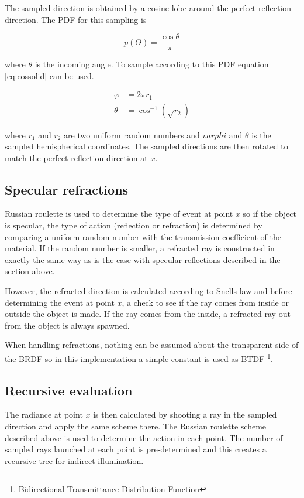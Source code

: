 \documentclass[a4paper]{report}
\begin{document}
The sampled direction is obtained by a cosine lobe around the perfect
reflection direction. The PDF for this sampling is

\begin{equation}
  p(\Theta) = \frac{\cos{\theta}}{\pi}
\end{equation}

where \(\theta\) is the incoming angle. To sample according to this
PDF equation \ref{eq:cossolid} can be used.

\begin{align}
  \varphi &= 2 \pi r_1 \nonumber \\
  \theta &= \cos^{-1}(\sqrt{r_2})
  \label{eq:cossolid}
\end{align}

where \(r_1\) and \(r_2\) are two uniform random numbers and
\(varphi\) and \(\theta\) is the sampled hemispherical coordinates. The sampled
directions are then rotated to match the perfect reflection direction
at \(x\).

\subsection{Specular refractions}

Russian roulette is used to determine the type of event at point \(x\)
so if the object is specular, the type of action (reflection or
refraction) is determined by comparing a uniform random number with
the transmission coefficient of the material. If the random number is
smaller, a refracted ray is constructed in exactly the same way as is
the case with specular reflections described in the section above.

However, the refracted direction is calculated according to Snells law
and before determining the event at point \(x\), a check to see if the
ray comes from inside or outside the object is made. If the ray comes
from the inside, a refracted ray out from the object is always
spawned.

When handling refractions, nothing can be assumed about the
transparent side of the BRDF so in this implementation a simple
constant is used as BTDF \footnote{Bidirectional Transmittance
  Distribution Function}.

\subsection{Recursive evaluation}

The radiance at point \(x\) is then calculated by shooting a ray in
the sampled direction and apply the same scheme there. The Russian
roulette scheme described above is used to determine the action in
each point. The number of sampled rays launched at each point is
pre-determined and this creates a recursive tree for indirect illumination.
\end{document}
